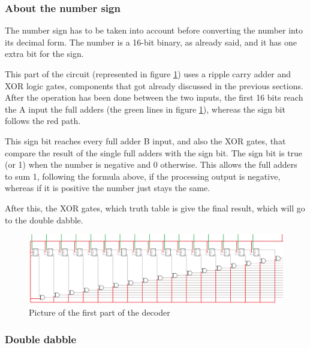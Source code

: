 \documentclass{article}
\begin{document}
\subsubsection{About the number sign}

The number sign has to be taken into account before converting the number into its decimal form. The number is a 16-bit binary, as already said, and it has one extra bit for the sign.

\vspace{3mm}

This part of the circuit (represented in figure \ref{Converter_bis}) uses a ripple carry adder and XOR logic gates, components that got already discussed in the previous sections. After the operation has been done between the two inputs, the first 16 bits reach the A input the full adders (the green lines in figure \ref{Converter_bis}), whereas the sign bit follows the red path.

\vspace{3mm}

This sign bit reaches every full adder B input, and also the XOR gates, that compare the result of the single full adders with the sign bit. The sign bit is true (or 1) when the number is negative and 0 otherwise. This allows the full adders to sum 1, following the formula above, if the processing output is negative, whereas if it is positive the number just stays the same.

\vspace{3mm} 

After this, the XOR gates, which truth table is give the final result, which will go to the double dabble.

\begin{figure}[h]
    \centering
    \includegraphics[scale=0.43]{SC_Converter.PNG}
    \caption{Picture of the first part of the decoder}
    \label{Converter_bis}
  \end{figure}
\pagebreak
\subsubsection{Double dabble}
\end{document}
